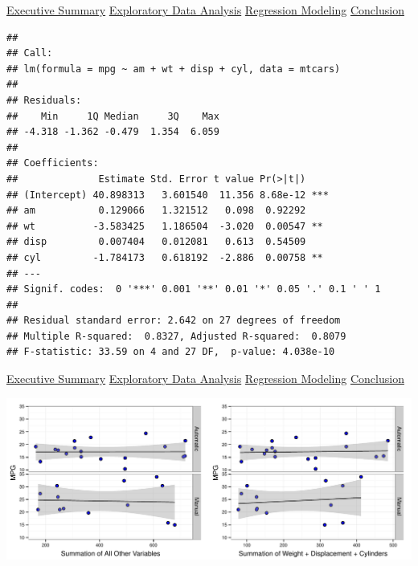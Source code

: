 \documentclass[10pt,]{article}
\begin{document}
\hyperref[eo]{Executive Summary} \textbar{} \hyperref[eda]{Exploratory
Data Analysis} \textbar{} \hyperref[rm]{Regression Modeling} \textbar{}
\hyperref[conclusion]{Conclusion}


\begin{verbatim}
## 
## Call:
## lm(formula = mpg ~ am + wt + disp + cyl, data = mtcars)
## 
## Residuals:
##    Min     1Q Median     3Q    Max 
## -4.318 -1.362 -0.479  1.354  6.059 
## 
## Coefficients:
##              Estimate Std. Error t value Pr(>|t|)    
## (Intercept) 40.898313   3.601540  11.356 8.68e-12 ***
## am           0.129066   1.321512   0.098  0.92292    
## wt          -3.583425   1.186504  -3.020  0.00547 ** 
## disp         0.007404   0.012081   0.613  0.54509    
## cyl         -1.784173   0.618192  -2.886  0.00758 ** 
## ---
## Signif. codes:  0 '***' 0.001 '**' 0.01 '*' 0.05 '.' 0.1 ' ' 1
## 
## Residual standard error: 2.642 on 27 degrees of freedom
## Multiple R-squared:  0.8327, Adjusted R-squared:  0.8079 
## F-statistic: 33.59 on 4 and 27 DF,  p-value: 4.038e-10
\end{verbatim}

\hyperref[eo]{Executive Summary} \textbar{} \hyperref[eda]{Exploratory
Data Analysis} \textbar{} \hyperref[rm]{Regression Modeling} \textbar{}
\hyperref[conclusion]{Conclusion}


\includegraphics{RegressionModelsProj_3_files/figure-latex/unnamed-chunk-15-1.pdf}
\end{document}
